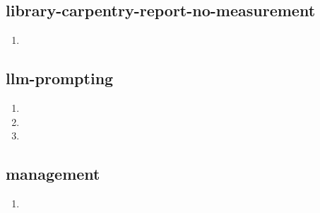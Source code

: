 \documentclass{article}
\begin{document}
\subsection{library-carpentry-report-no-measurement}
\begin{enumerate}
\item {}
\end{enumerate}

\subsection{llm-prompting}
\begin{enumerate}
\item {}
\item {}
\item {}
\end{enumerate}

\subsection{management}
\begin{enumerate}
\item {}
\end{enumerate}
\end{document}
